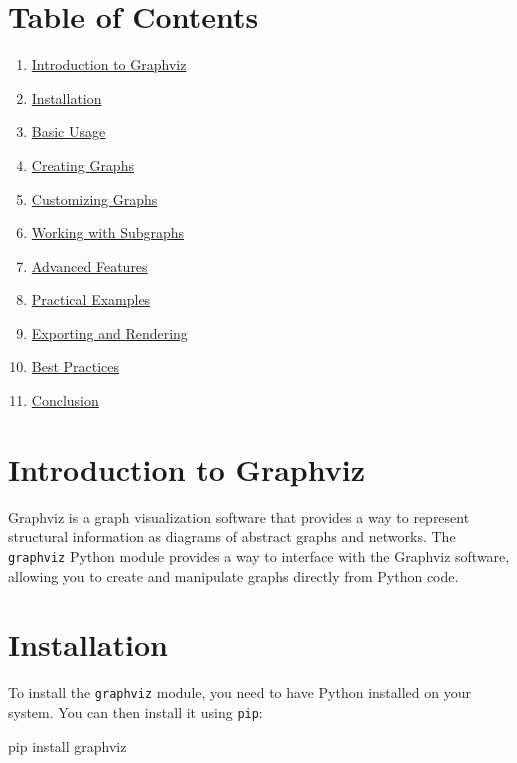 \documentclass[
  letterpaper,
  DIV=11,
  numbers=noendperiod]{scrreprt}
\newenvironment{Shaded}{\begin{snugshade}}{\end{snugshade}}
\newcommand{\ExtensionTok}[1]{\textcolor[rgb]{0.00,0.23,0.31}{#1}}
\newcommand{\NormalTok}[1]{\textcolor[rgb]{0.00,0.23,0.31}{#1}}
\providecommand{\tightlist}{%
  \setlength{\itemsep}{0pt}\setlength{\parskip}{0pt}}\usepackage{longtable,booktabs,array}
\begin{document}
\section{Table of Contents}\label{table-of-contents-15}

\begin{enumerate}
\def\labelenumi{\arabic{enumi}.}
\tightlist
\item
  \hyperref[introduction-to-graphviz]{Introduction to Graphviz}
\item
  \hyperref[installation]{Installation}
\item
  \hyperref[basic-usage]{Basic Usage}
\item
  \hyperref[creating-graphs]{Creating Graphs}
\item
  \hyperref[customizing-graphs]{Customizing Graphs}
\item
  \hyperref[working-with-subgraphs]{Working with Subgraphs}
\item
  \hyperref[advanced-features]{Advanced Features}
\item
  \hyperref[practical-examples]{Practical Examples}
\item
  \hyperref[exporting-and-rendering]{Exporting and Rendering}
\item
  \hyperref[best-practices]{Best Practices}
\item
  \hyperref[conclusion]{Conclusion}
\end{enumerate}

\section{Introduction to Graphviz}\label{introduction-to-graphviz}

Graphviz is a graph visualization software that provides a way to
represent structural information as diagrams of abstract graphs and
networks. The \texttt{graphviz} Python module provides a way to
interface with the Graphviz software, allowing you to create and
manipulate graphs directly from Python code.

\section{Installation}\label{installation-2}

To install the \texttt{graphviz} module, you need to have Python
installed on your system. You can then install it using \texttt{pip}:

\begin{Shaded}
\begin{Highlighting}[]
\ExtensionTok{pip}\NormalTok{ install graphviz}
\end{Highlighting}
\end{Shaded}
\end{document}
